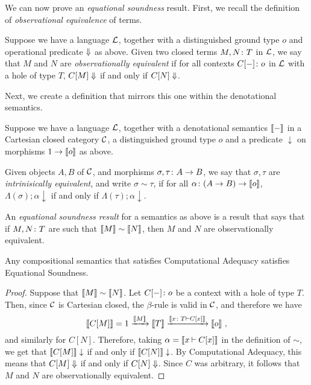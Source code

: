We can now prove an \emph{equational soundness} result.
First, we recall the definition of \emph{observational equivalence} of terms.

\begin{definition}
  Suppose we have a language $\mathcal L$, together with a distinguished ground type $o$ and operational predicate $\Downarrow$ as above.  
  Given two closed terms $M,N\colon T$ in $\mathcal L$, we say that $M$ and $N$ are \emph{observationally equivalent} if for all contexts $C[-]\colon o$ in $\mathcal L$ with a hole of type $T$, $C[M]\Downarrow$ if and only if $C[N] \Downarrow$.
\end{definition}

Next, we create a definition that mirrors this one within the denotational semantics.

\begin{definition}
  Suppose we have a language $\mathcal L$, together with a denotational semantics $\left\llbracket-\right\rrbracket$ in a Cartesian closed category ${\mathcal{C}}$, a distinguished ground type $o$ and a predicate $\downarrow$ on morphisms $1 \to \left\llbracket o\right\rrbracket$ as above.  

  Given objects $A,B$ of ${\mathcal{C}}$, and morphisms $\sigma,\tau\colon A \to B$, we say that $\sigma,\tau$ are \emph{intrinisically equivalent}, and write $\sigma\sim\tau$, if for all $\alpha\colon (A \to B) \to \left\llbracket o\right\rrbracket$, $\Lambda(\sigma);\alpha\downarrow$ if and only if $\Lambda(\tau);\alpha\downarrow$.
\end{definition}

\begin{definition}
  An \emph{equational soundness result} for a semantics as above is a result that says that if $M,N\colon T$ are such that $\left\llbracket M\right\rrbracket\sim\left\llbracket N\right\rrbracket$, then $M$ and $N$ are observationally equivalent.
\end{definition}

\begin{proposition}
  Any compositional semantics that satisfies Computational Adequacy satisfies Equational Soundness.
  \label{PropEquationalSoundness}
\end{proposition}
\begin{proof}
  Suppose that $\left\llbracket M\right\rrbracket\sim\left\llbracket N\right\rrbracket$.  
  Let $C[-]\colon o$ be a context with a hole of type $T$.
  Then, since ${\mathcal{C}}$ is Cartesian closed, the $\beta$-rule is valid in ${\mathcal{C}}$, and therefore we have
  \[
    \left\llbracket C[M]\right\rrbracket = 1 \xrightarrow{\left\llbracket M\right\rrbracket} \left\llbracket T\right\rrbracket \xrightarrow{\left\llbracket x\colon T\mathbin{\vdash} C[x]\right\rrbracket} \left\llbracket o\right\rrbracket\,,
    \]
  and similarly for $C[N]$.  
  Therefore, taking $\alpha=\left\llbracket x\mathbin{\vdash} C[x]\right\rrbracket$ in the definition of $\sim$, we get that $\left\llbracket C[M]\right\rrbracket\downarrow$ if and only if $\left\llbracket C[N]\right\rrbracket\downarrow$.  
  By Computational Adequacy, this means that $C[M]\Downarrow$ if and only if $C[N]\Downarrow$.  
  Since $C$ was arbitrary, it follows that $M$ and $N$ are observationally equivalent.
\end{proof}

